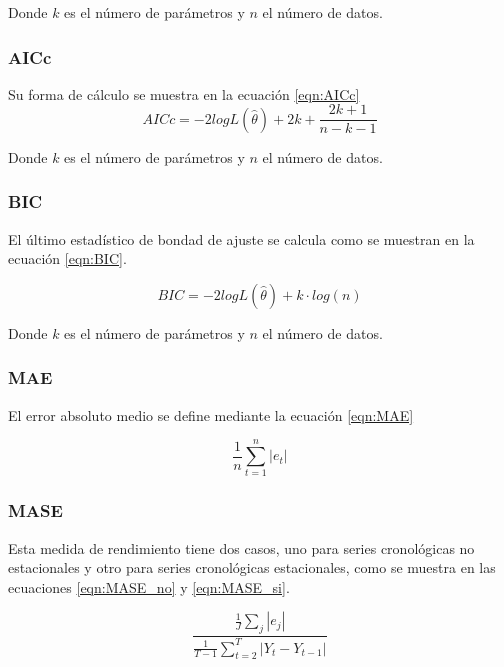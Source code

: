 \documentclass[
]{article}
\begin{document}
Donde \(k\) es el número de parámetros y \(n\) el número de datos.

\subsubsection{AICc}

Su forma de cálculo se muestra en la ecuación \ref{eqn:AICc}
\begin{equation}
\label{eqn:AICc}
AICc=-2logL\left(\hat\theta\right)+2k+\frac{2k+1}{n-k-1}
\end{equation}

Donde \(k\) es el número de parámetros y \(n\) el número de datos.

\subsubsection{BIC}

El último estadístico de bondad de ajuste se calcula como se muestran en
la ecuación \ref{eqn:BIC}.

\begin{equation}
\label{eqn:BIC}
BIC=-2logL\left(\hat\theta\right)+k\cdot log(n)
\end{equation}

Donde \(k\) es el número de parámetros y \(n\) el número de datos.

\subsubsection{MAE}

El error absoluto medio se define mediante la ecuación \ref{eqn:MAE}

\begin{equation}
\label{eqn:MAE}
\frac{1}{n}\sum_{t=1}^n |e_t|
\end{equation}

\subsubsection{MASE}

Esta medida de rendimiento tiene dos casos, uno para series cronológicas
no estacionales y otro para series cronológicas estacionales, como se
muestra en las ecuaciones \ref{eqn:MASE_no} y \ref{eqn:MASE_si}.

\begin{equation}
\label{eqn:MASE_no}
\frac{\frac{1}{J}\sum_j|e_j|}{\frac{1}{T-1}\sum_{t=2}^T|Y_t-Y_{t-1}|}
\end{equation}
\end{document}
